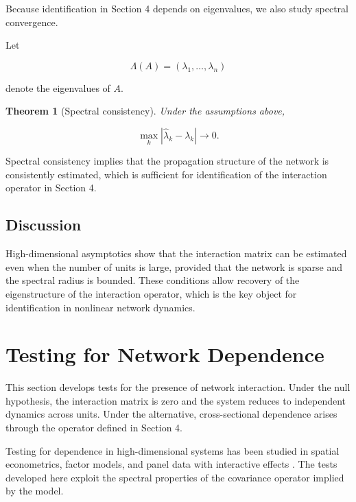 \documentclass[12pt]{article}
\numberwithin{equation}{section}
\newtheorem{theorem}{Theorem}[section]
\begin{document}
Because identification in Section 4 depends on eigenvalues, we also study
spectral convergence.

Let

\begin{equation}
\Lambda(A)
=
(\lambda_1,\ldots,\lambda_n)
\label{eq:6.lambda}
\end{equation}

denote the eigenvalues of $A$.

\begin{theorem}[Spectral consistency]

Under the assumptions above,

\begin{equation}
\max_k
|
\hat\lambda_k - \lambda_k
|
\to 0.
\label{eq:6.spectral}
\end{equation}

\end{theorem}

Spectral consistency implies that the propagation structure of the network is
consistently estimated, which is sufficient for identification of the
interaction operator in Section 4.

\subsection{Discussion}

High-dimensional asymptotics show that the interaction matrix can be
estimated even when the number of units is large, provided that the network
is sparse and the spectral radius is bounded. These conditions allow recovery
of the eigenstructure of the interaction operator, which is the key object
for identification in nonlinear network dynamics.

\section{Testing for Network Dependence}

This section develops tests for the presence of network interaction.
Under the null hypothesis, the interaction matrix is zero and the system
reduces to independent dynamics across units. Under the alternative,
cross-sectional dependence arises through the operator defined in
Section 4.

Testing for dependence in high-dimensional systems has been studied in
spatial econometrics, factor models, and panel data with interactive
effects \citep{anselin1988spatial, bai2003inferential, pesaran2004general,
pesaran2015testing}. The tests developed here exploit the spectral
properties of the covariance operator implied by the model.
\end{document}
